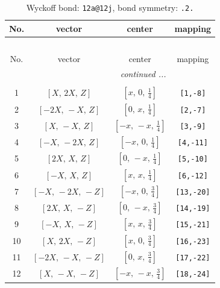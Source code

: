 \documentclass[fleqn,8pt]{jsarticle}
\begin{document}
\begin{longtable}{cccc}
\caption{Wyckoff bond: {\tt 12a@12j}, bond symmetry: {\tt .2.}}
 \\
 \hline \hline
No. & vector & center & mapping \\ \hline \endfirsthead

\multicolumn{3}{l}{\tablename\ \thetable{}} \\
 \hline \hline
No. & vector & center & mapping \\ \hline \endhead

 \hline \hline
\multicolumn{3}{r}{\footnotesize\it continued ...} \\ \endfoot

 \hline \hline
\multicolumn{3}{r}{} \\ \endlastfoot

1 & $\left[ X,\, 2 X,\, Z \right]$ & $\left[ x,\, 0,\, \frac{1}{4} \right]$ & {\tt [1,-8]} \\ \hline
2 & $\left[ - 2 X,\, - X,\, Z \right]$ & $\left[ 0,\, x,\, \frac{1}{4} \right]$ & {\tt [2,-7]} \\ \hline
3 & $\left[ X,\, - X,\, Z \right]$ & $\left[ - x,\, - x,\, \frac{1}{4} \right]$ & {\tt [3,-9]} \\ \hline
4 & $\left[ - X,\, - 2 X,\, Z \right]$ & $\left[ - x,\, 0,\, \frac{1}{4} \right]$ & {\tt [4,-11]} \\ \hline
5 & $\left[ 2 X,\, X,\, Z \right]$ & $\left[ 0,\, - x,\, \frac{1}{4} \right]$ & {\tt [5,-10]} \\ \hline
6 & $\left[ - X,\, X,\, Z \right]$ & $\left[ x,\, x,\, \frac{1}{4} \right]$ & {\tt [6,-12]} \\ \hline
7 & $\left[ - X,\, - 2 X,\, - Z \right]$ & $\left[ - x,\, 0,\, \frac{3}{4} \right]$ & {\tt [13,-20]} \\ \hline
8 & $\left[ 2 X,\, X,\, - Z \right]$ & $\left[ 0,\, - x,\, \frac{3}{4} \right]$ & {\tt [14,-19]} \\ \hline
9 & $\left[ - X,\, X,\, - Z \right]$ & $\left[ x,\, x,\, \frac{3}{4} \right]$ & {\tt [15,-21]} \\ \hline
10 & $\left[ X,\, 2 X,\, - Z \right]$ & $\left[ x,\, 0,\, \frac{3}{4} \right]$ & {\tt [16,-23]} \\ \hline
11 & $\left[ - 2 X,\, - X,\, - Z \right]$ & $\left[ 0,\, x,\, \frac{3}{4} \right]$ & {\tt [17,-22]} \\ \hline
12 & $\left[ X,\, - X,\, - Z \right]$ & $\left[ - x,\, - x,\, \frac{3}{4} \right]$ & {\tt [18,-24]} \\
\end{longtable}
\end{document}

